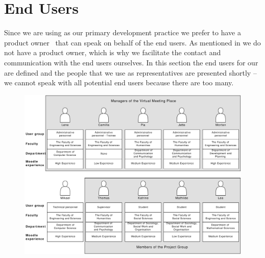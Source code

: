 \section{End Users}
\label{sec:enduser}
Since we are using \scrum{} as our primary development practice we prefer to have a product owner~\cite[p.~115]{Larman04} that can speak on behalf of the end users.
As mentioned in  we do not have a product owner, which is why we facilitate the contact and communication with the end users ourselves.
In this section the end users for our \subsystem{} are defined and the people that we use as representatives are presented shortly -- we cannot speak with all potential end users because there are too many.

\begin{landscape}
\begin{figure}[p]%
\includegraphics[width=\textwidth]{images/UserGroups2}%
%
\label{fig:usergroup}%
\end{figure}
\end{landscape}

